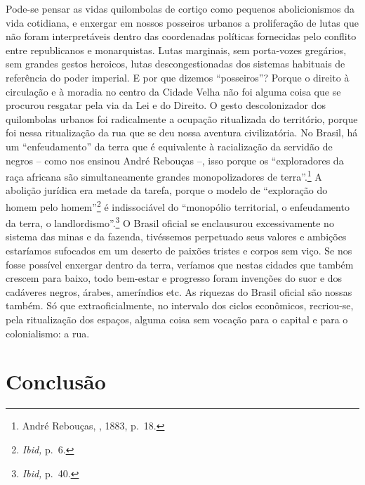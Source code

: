 Pode-se pensar as vidas quilombolas de cortiço como pequenos
abolicionismos da vida cotidiana, e enxergar em nossos posseiros urbanos
a proliferação de lutas que não foram interpretáveis dentro das
coordenadas políticas fornecidas pelo conflito entre republicanos e
monarquistas. Lutas marginais, sem porta-vozes gregários, sem grandes
gestos heroicos, lutas descongestionadas dos sistemas habituais de
referência do poder imperial. E por que dizemos ``posseiros''? Porque o
direito à circulação e à moradia no centro da Cidade Velha não foi
alguma coisa que se procurou resgatar pela via da Lei e do Direito. O
gesto descolonizador dos quilombolas urbanos foi radicalmente a ocupação
ritualizada do território, porque foi nessa ritualização da rua que se
deu nossa aventura civilizatória. No Brasil, há um ``enfeudamento'' da
terra que é equivalente à racialização da servidão de negros -- como nos
ensinou André Rebouças --, isso porque os ``exploradores da raça
africana são simultaneamente grandes monopolizadores de
terra''.\footnote{André Rebouças, , 1883, p.~18.} A abolição jurídica
era metade da tarefa, porque o modelo de ``exploração do homem pelo
homem''\footnote{\emph{Ibid,} p.~6.} é indissociável do ``monopólio
territorial, o enfeudamento da terra, o landlordismo''.\footnote{\emph{Ibid,}
  p.~40.} O Brasil oficial se enclausurou excessivamente no sistema das
minas e da fazenda, tivéssemos perpetuado seus valores e ambições
estaríamos sufocados em um deserto de paixões tristes e corpos sem viço.
Se nos fosse possível enxergar dentro da terra, veríamos que nestas
cidades que também crescem para baixo, todo bem-estar e progresso foram
invenções do suor e dos cadáveres negros, árabes, ameríndios etc. As
riquezas do Brasil oficial são nossas também. Só que extraoficialmente,
no intervalo dos ciclos econômicos, recriou-se, pela ritualização dos
espaços, alguma coisa sem vocação para o capital e para o colonialismo:
a rua.

\hypertarget{conclusuxe3o}{%
\section{Conclusão}\label{conclusuxe3o}}


